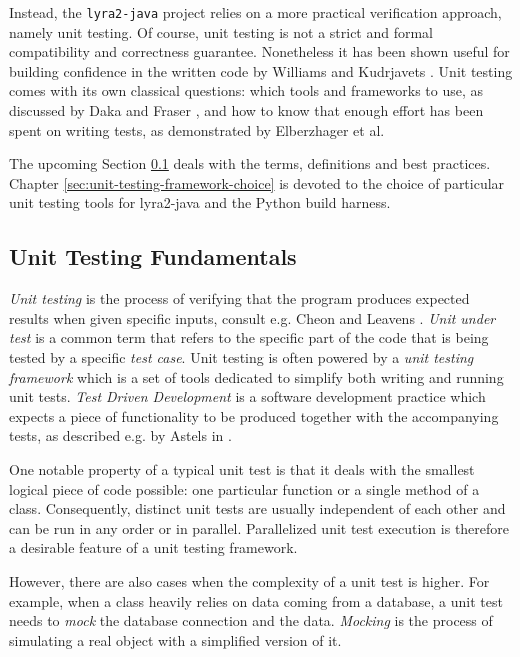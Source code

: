 Instead, the \texttt{lyra2-java} project relies on a more practical verification approach, namely unit testing. Of course, unit testing is not a strict and formal compatibility and correctness guarantee. Nonetheless it has been shown useful for building confidence in the written code by Williams and Kudrjavets \cite{williams:2010:unit-tests-rock}. Unit testing comes with its own classical questions: which tools and frameworks to use, as discussed by Daka and Fraser \cite{daka:2014:unit-testing-tools}, and how to know that enough effort has been spent on writing tests, as demonstrated by Elberzhager et al. \cite{elberzhager:2012:reducing-effort}

The upcoming Section \ref{sec:unit-testing-fundamentals} deals with the terms, definitions and best practices. Chapter \ref{sec:unit-testing-framework-choice} is devoted to the choice of particular unit testing tools for lyra2-java and the Python build harness.

\subsection{Unit Testing Fundamentals}
\label{sec:unit-testing-fundamentals}

\emph{Unit testing} is the process of verifying that the program produces expected results when given specific inputs, consult e.g. Cheon and Leavens \cite{cheon2002simple}. \emph{Unit under test} is a common term that refers to the specific part of the code that is being tested by a specific \emph{test case}. Unit testing is often powered by a \emph{unit testing framework} which is a set of tools dedicated to simplify both writing and running unit tests. \emph{Test Driven Development} is a software development practice which expects a piece of functionality to be produced together with the accompanying tests, as described e.g. by Astels in \cite{Astels:2003:TDD:864016}.

One notable property of a typical unit test is that it deals with the smallest logical piece of code possible: one particular function or a single method of a class. Consequently, distinct unit tests are usually independent of each other and can be run in any order or in parallel. Parallelized unit test execution is therefore a desirable feature of a unit testing framework.

However, there are also cases when the complexity of a unit test is higher. For example, when a class heavily relies on data coming from a database, a unit test needs to \emph{mock} the database connection and the data. \emph{Mocking} is the process of simulating a real object with a simplified version of it.

